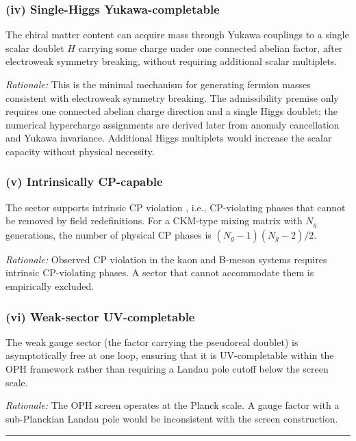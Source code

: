 \subsubsection{(iv) Single-Higgs Yukawa-completable}\label{iv-single-higgs-yukawa-completable}

The chiral matter content can acquire mass through Yukawa couplings to a single scalar doublet \(H\) carrying some charge under one connected abelian factor, after electroweak symmetry breaking, without requiring additional scalar multiplets.

\emph{Rationale:} This is the minimal mechanism for generating fermion masses consistent with electroweak symmetry breaking. The admissibility premise only requires one connected abelian charge direction and a single Higgs doublet; the numerical hypercharge assignments are derived later from anomaly cancellation and Yukawa invariance. Additional Higgs multiplets would increase the scalar capacity without physical necessity.

\subsubsection{(v) Intrinsically CP-capable}\label{v-intrinsically-cp-capable}

The sector supports intrinsic CP violation , i.e., CP-violating phases that cannot be removed by field redefinitions. For a CKM-type mixing matrix with \(N_g\) generations, the number of physical CP phases is \((N_g - 1)(N_g - 2)/2\).

\emph{Rationale:} Observed CP violation in the kaon and B-meson systems requires intrinsic CP-violating phases. A sector that cannot accommodate them is empirically excluded.

\subsubsection{(vi) Weak-sector UV-completable}\label{vi-weak-sector-uv-completable}

The weak gauge sector (the factor carrying the pseudoreal doublet) is asymptotically free at one loop, ensuring that it is UV-completable within the OPH framework rather than requiring a Landau pole cutoff below the screen scale.

\emph{Rationale:} The OPH screen operates at the Planck scale. A gauge factor with a sub-Planckian Landau pole would be inconsistent with the screen construction.

\begin{center}\rule{0.5\linewidth}{0.5pt}\end{center}

